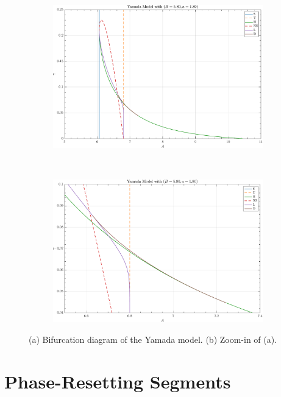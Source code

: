 \documentclass[11pt]{article}
\begin{document}
\begin{figure}[h]
  \centering
  \begin{subfigure}{0.48\linewidth}
    \caption{}
    \includegraphics[width=\linewidth]{./images/bifurcations}
  \end{subfigure}
  ~
  \begin{subfigure}{0.48\linewidth}
    \caption{}
    \includegraphics[width=\linewidth]{./images/bifurcations_zoomed}
  \end{subfigure}
  \caption{(a) Bifurcation diagram of the Yamada model. (b) Zoom-in of (a).}
  \label{fig:bifurcation_diagram}
\end{figure}

\section*{Phase-Resetting Segments}
\end{document}
